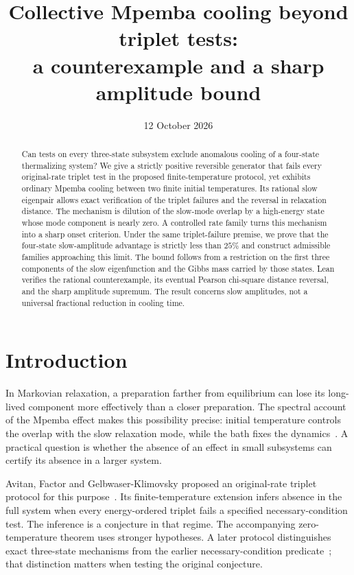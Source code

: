 \documentclass[11pt]{article}
\title{Collective Mpemba cooling beyond triplet tests:\\a counterexample and a sharp amplitude bound}
\author{}
\date{12 October 2026}
\begin{document}
\maketitle
\begin{abstract}
Can tests on every three-state subsystem exclude anomalous cooling of a
four-state thermalizing system? We give a strictly positive reversible
generator that fails every original-rate triplet test in the proposed
finite-temperature protocol, yet exhibits ordinary Mpemba cooling between
two finite initial temperatures. Its rational slow eigenpair allows exact
verification of the triplet failures and the reversal in relaxation
distance. The mechanism is dilution of the slow-mode overlap by a
high-energy state whose mode component is nearly zero. A controlled rate
family turns this mechanism into a sharp onset criterion. Under the same
triplet-failure premise, we prove that the four-state slow-amplitude
advantage is strictly less than $25\%$ and construct admissible families
approaching this limit. The bound follows from a restriction on the first
three components of the slow eigenfunction and the Gibbs mass carried by
those states. Lean verifies the rational counterexample, its eventual
Pearson chi-square distance reversal, and the sharp amplitude supremum.
The result concerns slow amplitudes, not a universal fractional reduction
in cooling time.
\end{abstract}

\section{Introduction}
In Markovian relaxation, a preparation farther from equilibrium can lose
its long-lived component more effectively than a closer preparation. The
spectral account of the Mpemba effect makes this possibility precise:
initial temperature controls the overlap with the slow relaxation mode,
while the bath fixes the dynamics~\cite{lu,klich}. A practical question is
whether the absence of an effect in small subsystems can certify its
absence in a larger system.

Avitan, Factor and Gelbwaser-Klimovsky proposed an original-rate triplet
protocol for this purpose~\cite{avitan}. Its finite-temperature extension
infers absence in the full system when every energy-ordered triplet fails
a specified necessary-condition test. The inference is a conjecture in
that regime. The accompanying zero-temperature theorem uses stronger
hypotheses. A later protocol distinguishes exact three-state mechanisms
from the earlier necessary-condition predicate~\cite{protocol}; that
distinction matters when testing the original conjecture.
\end{document}
